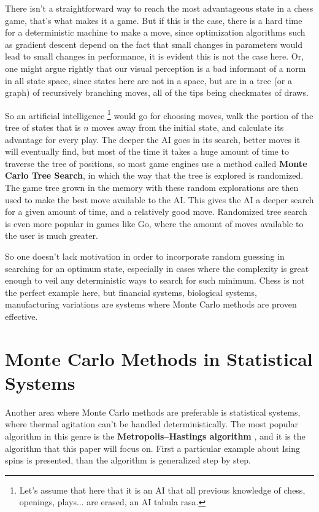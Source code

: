 There isn't a straightforward way to reach the most advantageous state in a chess game, that's what makes it a game. But if this is the case, there is a hard time for a deterministic machine to make a move, since optimization algorithms such as gradient descent depend on the fact that small changes in parameters would lead to small changes in performance, it is evident this is not the case here. Or, one might argue rightly that our visual perception is a bad informant of a norm in all state space, since states here are not in a space, but are in a tree (or a graph) of recursively branching moves, all of the tips being checkmates of draws.  

So an artificial intelligence  \footnote{Let's assume that here that it is an AI that all previous knowledge of chess, openings, plays... are erased, an AI tabula rasa.} would go for choosing moves, walk the portion of the tree of states that is $ n $ moves away from the initial state, and calculate its advantage for every play. The deeper the AI goes in its search, better moves it will eventually find, but most of the time it takes a huge amount of time to traverse the tree of positions, so most game engines use a method called \textbf{Monte Carlo Tree Search}, in which the way that the tree is explored is randomized. The game tree grown in the memory with these random explorations are then used to make the best move available to the AI. This gives the AI a deeper search for a given amount of time, and a relatively good move. Randomized tree search is even more popular in games like Go, where the amount of moves available to the user is much greater.

So one doesn't lack motivation in order to incorporate random guessing in searching for an optimum state, especially in cases where the complexity is great enough to veil any deterministic ways to search for such minimum. Chess is not the perfect example here, but financial systems, biological systems, manufacturing variations are systems where Monte Carlo methods are proven effective.    

\section{Monte Carlo Methods in Statistical Systems}

Another area where Monte Carlo methods are preferable is statistical systems, where thermal agitation can't be handled deterministically. The most popular algorithm in this genre is the \textbf{Metropolis–Hastings algorithm} \cite{metropolis}, and it is the algorithm that this paper will focus on. First a particular example about Ising spins is presented, than the algorithm is generalized step by step. 

